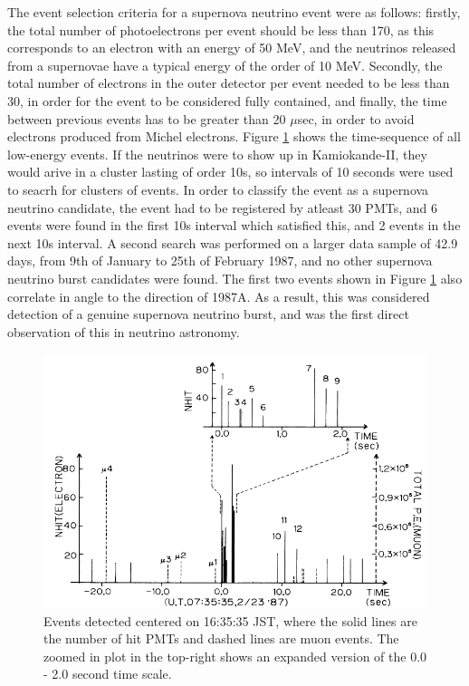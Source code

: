 The event selection criteria for a supernova neutrino event were as follows: firstly, the total number of photoelectrons per event should be less than 170, as this corresponds to an electron with an energy of 50 MeV, and the neutrinos released from a supernovae have a typical energy of the order of 10 MeV. Secondly, the total number of electrons in the outer detector per event needed to be less than 30, in order for the event to be considered fully contained, and finally, the time between previous events has to be greater than 20 $\mu$sec, in order to avoid electrons produced from Michel electrons. Figure \ref{fig:1987A_events} shows the time-sequence of all low-energy events. If the neutrinos were to show up in Kamiokande-II, they would arive in a cluster lasting of order 10s, so intervals of 10 seconds were used to seacrh for clusters of events. In order to classify the event as a supernova neutrino candidate, the event had to be registered by atleast 30 PMTs, and 6 events were found in the first 10s interval which satisfied this, and 2 events in the next 10s interval. A second search was performed on a larger data sample of 42.9 days, from 9th of January to 25th of February 1987, and no other supernova neutrino burst candidates were found. The first two events shown in Figure \ref{fig:1987A_events} also correlate in angle to the direction of 1987A. As a result, this was considered detection of a genuine supernova neutrino burst, and was the first direct observation of this in neutrino astronomy. 

\begin{figure}
    \includegraphics[width=\textwidth]{Figures/1987A_events.png}
    \caption{Events detected centered on 16:35:35 JST,  where the solid lines are the number of hit PMTs and dashed lines are muon events. The zoomed in plot in the top-right shows an expanded version of the 0.0 - 2.0 second time scale.  }
    \label{fig:1987A_events}
\end{figure}

